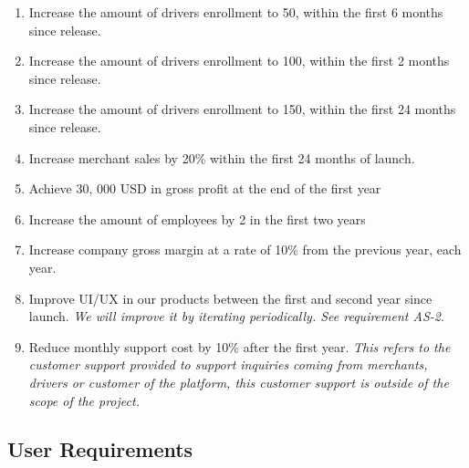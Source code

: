 \begin{enumerate}[label=BR-\arabic*]
    \item Increase the amount of drivers enrollment to 50, within the first 
    6 months since release.
    \item Increase the amount of drivers enrollment to 100, within the first 
    2 months since release.
    \pagebreak
    \item Increase the amount of drivers enrollment to 150, within the first 
    24 months since release.
    \item Increase merchant sales by 20\% within the first 24 months of launch.
    \item Achieve 30, 000 USD in gross profit at the end of the first year
    \item Increase the amount of employees by 2 in the first two years
    \item Increase company gross margin at a rate of 10\% from the previous 
    year, each year.
    \item Improve UI/UX in our products between the first and second year 
    since launch. \textit{We will improve it by iterating periodically. See 
    requirement AS-2}.
    \item Reduce monthly support cost by 10\% after the first year. 
    \textit{This refers to the customer support provided to support inquiries 
    coming from merchants, drivers or customer of the platform, this customer 
    support is outside of the scope of the project.} 
\end{enumerate}
\pagebreak 
\subsection{User Requirements}
